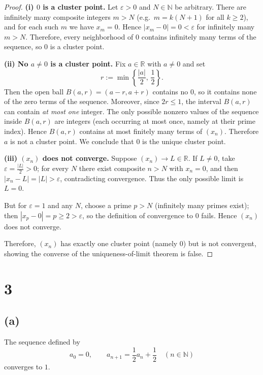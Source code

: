 \documentclass[12pt,a4paper]{article}
\theoremstyle{definition}
\theoremstyle{remark}
\begin{document}
\begin{proof}
\textbf{(i) $0$ is a cluster point.}
Let $\varepsilon>0$ and $N\in\mathbb{N}$ be arbitrary. There are infinitely many composite integers $m>N$ (e.g.\ $m=k(N+1)$ for all $k\ge2$), and for each such $m$ we have $x_m=0$. Hence $|x_m-0|=0<\varepsilon$ for infinitely many $m>N$. Therefore, every neighborhood of $0$ contains infinitely many terms of the sequence, so $0$ is a cluster point.

\medskip
\textbf{(ii) No $a\neq 0$ is a cluster point.}
Fix $a\in\mathbb{R}$ with $a\neq 0$ and set
\[
r:=\min\!\left\{\frac{|a|}{2},\,\frac{1}{2}\right\}.
\]
Then the open ball $B(a,r)=(a-r,a+r)$ contains no $0$, so it contains none of the zero terms of the sequence. Moreover, since $2r\le 1$, the interval $B(a,r)$ can contain \emph{at most one} integer. The only possible nonzero values of the sequence inside $B(a,r)$ are integers (each occurring at most once, namely at their prime index). Hence $B(a,r)$ contains at most finitely many terms of $(x_n)$. Therefore $a$ is not a cluster point. We conclude that $0$ is the unique cluster point.

\medskip
\textbf{(iii) $(x_n)$ does not converge.}
Suppose $(x_n)\to L\in\mathbb{R}$. If $L\neq 0$, take $\varepsilon=\tfrac{|L|}{2}>0$; for every $N$ there exist composite $n>N$ with $x_n=0$, and then $|x_n-L|=|L|>\varepsilon$, contradicting convergence. Thus the only possible limit is $L=0$.

But for $\varepsilon=1$ and any $N$, choose a prime $p>N$ (infinitely many primes exist); then $|x_p-0|=p\ge 2>\varepsilon$, so the definition of convergence to $0$ fails. Hence $(x_n)$ does not converge.

Therefore, $(x_n)$ has exactly one cluster point (namely $0$) but is not convergent, showing the converse of the uniqueness-of-limit theorem is false.
\end{proof}



\section*{3}
\subsection*{(a)}
The sequence defined by
\[
a_0 = 0, \qquad a_{n+1} = \frac{1}{2}a_n + \frac{1}{2} \quad (n \in \mathbb{N})
\]
converges to $1$.
\end{document}
